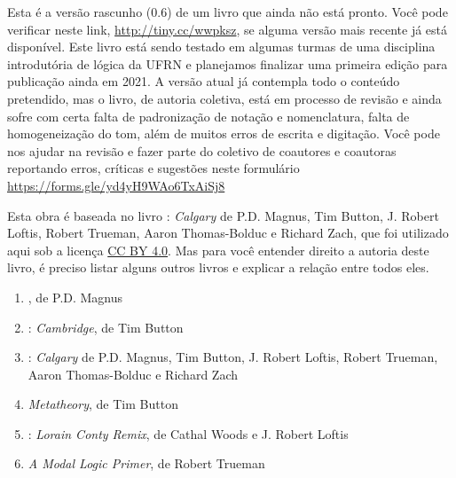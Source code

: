 \parbox{3 in}{
Esta é a versão rascunho (0.6) de um livro que ainda não está pronto.
Você pode verificar neste link, \hbox{\url{http://tiny.cc/wwpksz}}, se alguma versão mais recente já está disponível.
Este livro está sendo testado em algumas turmas de uma disciplina introdutória de lógica da UFRN e planejamos finalizar uma primeira edição para publicação ainda em 2021. 
A versão atual já contempla todo o conteúdo pretendido, mas o livro, de autoria coletiva, está em processo de revisão e ainda sofre com certa falta de padronização de notação e nomenclatura, falta de homogeneização do tom, além de muitos erros de escrita e digitação.
Você pode nos ajudar na revisão e fazer parte do coletivo de coautores e coautoras reportando erros, críticas e sugestões neste formulário
\hbox{\url{https://forms.gle/yd4yH9WAo6TxAiSj8}} 
}

\newpage

\noindent Esta obra é baseada no livro \forallx: \textit{Calgary} de P.D. Magnus, Tim Button, J. Robert Loftis, Robert Trueman, Aaron Thomas-Bolduc e Richard Zach, que foi utilizado aqui sob a licença \href{https://creativecommons.org/licenses/by/4.0/}{CC BY 4.0}.
Mas para você entender direito a autoria deste livro, é preciso listar alguns outros livros e explicar a relação entre todos eles.

\begin{enumerate}
   \item \forallx, de P.D. Magnus

   \item \forallx: \textit{Cambridge}, de Tim Button

   \item \forallx: \textit{Calgary} de P.D. Magnus, Tim Button, J. Robert Loftis, Robert Trueman, Aaron Thomas-Bolduc e Richard Zach
   
   \item \textit{Metatheory}, de Tim Button
   
   \item  \forallx: \textit{Lorain Conty Remix}, de Cathal Woods e J. Robert Loftis
   
   \item \textit{A Modal Logic Primer}, de Robert Trueman
\end{enumerate}

